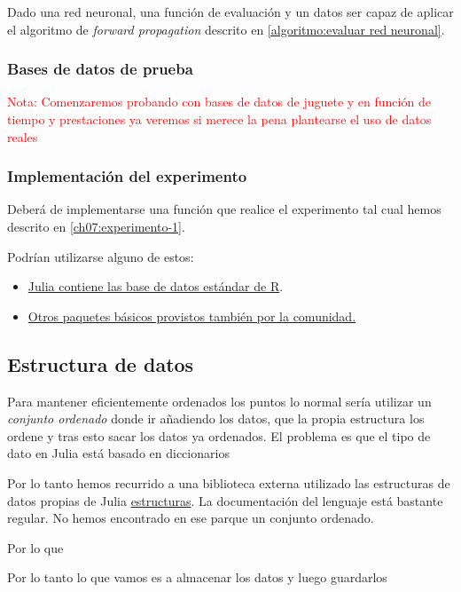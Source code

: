 Dado una red neuronal, una función de evaluación y un datos ser capaz de aplicar el algoritmo de \textit{forward propagation} descrito en \ref{algoritmo:evaluar red neuronal}.


\subsubsection{Bases de datos de prueba}
\textcolor{red}{Nota:
Comenzaremos probando con bases de datos de juguete 
y en función de tiempo y prestaciones ya veremos si merece la pena plantearse el uso de datos reales
}

\subsubsection{Implementación del experimento} 
Deberá de implementarse una función que realice el 
experimento tal cual hemos descrito en \ref{ch07:experimento-1}.

Podrían utilizarse alguno de estos: 

\begin{itemize}
    \item \href{https://github.com/JuliaStats/RDatasets.jl}{Julia contiene las base de datos estándar de R}.
    \item \href{https://juliaml.github.io/MLDatasets.jl/stable/}{Otros paquetes básicos provistos también por la comunidad.}
\end{itemize}

\subsection*{Estructura de datos}
Para mantener eficientemente ordenados los puntos 
lo normal sería utilizar un \textit{conjunto ordenado} donde ir añadiendo los datos, que la propia estructura los ordene y tras esto sacar
los datos ya ordenados. 
El problema es que el tipo de dato  en Julia está basado en diccionarios

Por lo tanto hemos recurrido a una biblioteca externa
utilizado las estructuras de datos propias de Julia 
\href{https://juliacollections.github.io/DataStructures.jl/v0.9/sorted_containers.html}{estructuras}. 
La documentación del lenguaje está bastante regular. 
No hemos encontrado en ese parque un conjunto ordenado. 

Por lo que 


Por lo tanto lo que vamos es a almacenar los datos y luego guardarlos